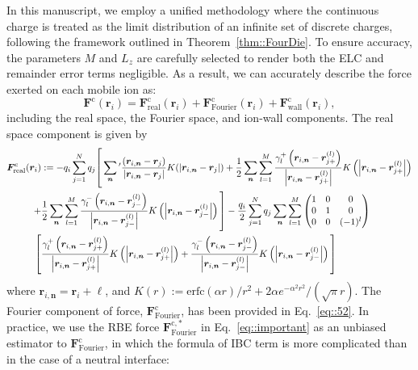 In this manuscript, we employ a unified methodology where the continuous charge is treated as the limit distribution of an infinite set of discrete charges, following the framework outlined in Theorem~\ref{thm::FourDie}. To ensure accuracy, the parameters $M$ and $L_z$ are carefully selected to render both the ELC and remainder error terms negligible. As a result, we can accurately describe the force exerted on each mobile ion as:
\begin{equation}
\bm{F}^{\text{c}}(\bm{r}_i)=\bm{F}^{\text{c}}_{\text{real}}(\bm{r}_i)+\bm{F}^{\text{c}}_{\text{Fourier}}(\bm{r}_i)+\bm{F}^{\text{c}}_{\text{wall}}(\bm{r}_i),
\end{equation}
including the real space, the Fourier space, and ion-wall components. The real space component is given by
\begin{equation}\label{eq::F_real_detail}
\begin{split}
\bm{F}_{\text{real}}^{\te{c}}(\bm{r}_i)
& := -q_i\sum_{j=1}^{N} q_j \Biggg[\sum_{\bm{n}}{}^\prime \frac{\left(\bm{r}_{i,\bm{n}} - \bm{r}_{j}\right)}{\abs{\bm{r}_{i,\bm{n}} - \bm{r}_{j}}} K(\abs{\bm{r}_{i,\bm{n}} - \bm{r}_{j}}) + \frac{1}{2} \sum_{\bm{n}} \sum_{l=1}^{M} \frac{\gamma_{l}^+\left(\bm{r}_{i,\bm{n}}-\bm{r}_{j+}^{(l)}\right)}{\left|\bm{r}_{i,\bm{n}}-\bm{r}_{j+}^{(l)}\right|} K\left(\left|\bm{r}_{i,\bm{n}}-\bm{r}_{j+}^{(l)}\right|\right)\\
+&\frac{1}{2}\sum_{\bm{n}}\sum_{l=1}^{M}\frac{\gamma_{l}^-\left(\bm{r}_{i,\bm{n}}-\bm{r}_{j-}^{(l)}\right)}{\left|\bm{r}_{i,\bm{n}}-\bm{r}_{j-}^{(l)}\right|}K\left(\left|\bm{r}_{i,\bm{n}}-\bm{r}_{j-}^{(l)}\right|\right)\Biggg]-\frac{q_i}{2}\sum_{j=1}^{N}q_j\sum_{\bm{n}}\sum_{l=1}^{M}\begin{pmatrix}
1&0&0\\
0&1&0\\
0&0&(-1)^l
\end{pmatrix}\\\Biggg[&
\frac{\gamma_{l}^+\left(\bm{r}_{i,\bm{n}}-\bm{r}_{j+}^{(l)}\right)}{\left|\bm{r}_{i,\bm{n}}-\bm{r}_{j+}^{(l)}\right|}K\left(\left|\bm{r}_{i,\bm{n}}-\bm{r}_{j+}^{(l)}\right|\right)+\frac{\gamma_{l}^-\left(\bm{r}_{i,\bm{n}}-\bm{r}_{j-}^{(l)}\right)}{\left|\bm{r}_{i,\bm{n}}-\bm{r}_{j-}^{(l)}\right|}K\left(\left|\bm{r}_{i,\bm{n}}-\bm{r}_{j-}^{(l)}\right|\right)\Biggg]
\end{split}
\end{equation}
where $\bm{r}_{i,\bm{n}}=\bm{r}_{i}+\bm{\ell}$, and $K(r):=\text{erfc}(\alpha r)/r^2+2\alpha e^{-\alpha^2r^2}/(\sqrt{\pi}r)$. The Fourier component of force, $\bm{F}^{\text{c}}_{\text{Fourier}}$, has been provided in Eq.~\eqref{eq::52}. In practice, we use the RBE force $\bm{F}^{\text{c},*}_{\text{Fourier}}$ in Eq.~\eqref{eq::important} as an unbiased estimator to $\bm{F}^{\text{c}}_{\text{Fourier}}$, in which the formula of IBC term is more complicated than  {in} the case of  {a} neutral interface:
